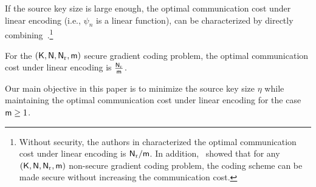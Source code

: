 \documentclass[conference,letterpaper]{IEEEtran}
\begin{document}
If the source key size is large enough, the optimal communication cost under linear encoding (i.e., $ \psi_n$ is a  linear function), can be  characterized by  directly combining~\cite{wan2022secure,ye2018communication}.\footnote{\label{foot:direct optimal}Without  security, the authors in \cite{ye2018communication} characterized  the optimal communication cost  under linear encoding  is ${\sf N}_{\rm r}/{\sf m}$. In addition,~\cite[Theorem 1]{wan2022secure} showed that for any $({\sf K}, {\sf N}, {\sf N}_{\rm r}, {\sf m})$ non-secure gradient coding problem, the coding scheme can be made secure without increasing the communication cost.} 
\begin{thm}
\label{thm:communication cost}
For the  $({\sf K},{\sf N},{\sf N}_{\rm r}, {\sf m})$ secure gradient coding problem, the optimal communication cost under linear encoding is 
$ \frac{{\sf N}_{\rm r}}{{\sf m}}$.
\end{thm}



Our main objective in this paper is to minimize the source key size $\eta$ while maintaining the optimal communication cost under linear encoding  for the case $ {\sf m} \geq 1$.

\end{document}
